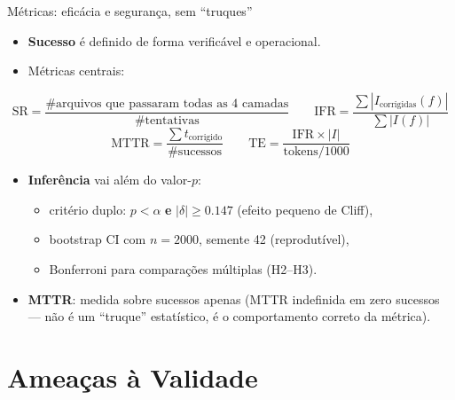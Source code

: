\documentclass[aspectratio=169]{beamer}
\begin{document}
\begin{frame}{Métricas: eficácia e segurança, sem ``truques''}
\small
\begin{itemize}
  \item \textbf{Sucesso} é definido de forma verificável e operacional.
  \item Métricas centrais:
\end{itemize}
\vspace{0.2em}
\[
  \text{SR} =
  \frac{\#\text{arquivos que passaram todas as 4 camadas}}{\#\text{tentativas}}
  \qquad
  \text{IFR} =
  \frac{\sum|I_{\text{corrigidas}}(f)|}{\sum|I(f)|}
\]
\[
  \text{MTTR} =
  \frac{\sum t_{\text{corrigido}}}{\#\text{sucessos}}
  \qquad
  \text{TE} =
  \frac{\text{IFR} \times |I|}{\text{tokens}/1000}
\]
\vspace{0.2em}
\begin{itemize}
  \item \textbf{Inferência} vai além do valor-$p$:
  \begin{itemize}
    \item critério duplo: $p < \alpha$ \textbf{e} $|\delta| \geq 0.147$
          (efeito pequeno de Cliff),
    \item bootstrap CI com $n=2000$, semente 42 (reprodutível),
    \item Bonferroni para comparações múltiplas (H2--H3).
  \end{itemize}
  \item \textbf{MTTR}: medida sobre sucessos apenas (MTTR indefinida em
        zero sucessos --- não é um ``truque'' estatístico, é o comportamento
        correto da métrica).
\end{itemize}
\end{frame}

\section{Ameaças à Validade}
\end{document}
